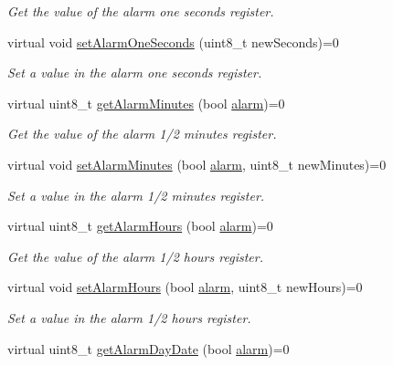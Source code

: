 \begin{DoxyCompactItemize}
\begin{DoxyCompactList}\small\item\em Get the value of the alarm one seconds register. \end{DoxyCompactList}\item 
virtual void \mbox{\hyperlink{classreal_time_clock_a448cbe8ab7f6649ee32eeb415721707f}{set\+Alarm\+One\+Seconds}} (uint8\+\_\+t new\+Seconds)=0
\begin{DoxyCompactList}\small\item\em Set a value in the alarm one seconds register. \end{DoxyCompactList}\item 
virtual uint8\+\_\+t \mbox{\hyperlink{classreal_time_clock_a0b3babca96f8246d4bb5e3ac2a95801d}{get\+Alarm\+Minutes}} (bool \mbox{\hyperlink{classalarm}{alarm}})=0
\begin{DoxyCompactList}\small\item\em Get the value of the alarm 1/2 minutes register. \end{DoxyCompactList}\item 
virtual void \mbox{\hyperlink{classreal_time_clock_a53ffba88cd87d05af58288fb4fc589b5}{set\+Alarm\+Minutes}} (bool \mbox{\hyperlink{classalarm}{alarm}}, uint8\+\_\+t new\+Minutes)=0
\begin{DoxyCompactList}\small\item\em Set a value in the alarm 1/2 minutes register. \end{DoxyCompactList}\item 
virtual uint8\+\_\+t \mbox{\hyperlink{classreal_time_clock_abca1ab557b357e3046d7d97eec89f750}{get\+Alarm\+Hours}} (bool \mbox{\hyperlink{classalarm}{alarm}})=0
\begin{DoxyCompactList}\small\item\em Get the value of the alarm 1/2 hours register. \end{DoxyCompactList}\item 
virtual void \mbox{\hyperlink{classreal_time_clock_a9f0cd64ce9a783f149fcbb9f7eb36524}{set\+Alarm\+Hours}} (bool \mbox{\hyperlink{classalarm}{alarm}}, uint8\+\_\+t new\+Hours)=0
\begin{DoxyCompactList}\small\item\em Set a value in the alarm 1/2 hours register. \end{DoxyCompactList}\item 
virtual uint8\+\_\+t \mbox{\hyperlink{classreal_time_clock_afe0a54cb2f803d01df03e2ea8e86bbf9}{get\+Alarm\+Day\+Date}} (bool \mbox{\hyperlink{classalarm}{alarm}})=0

\end{DoxyCompactItemize}
